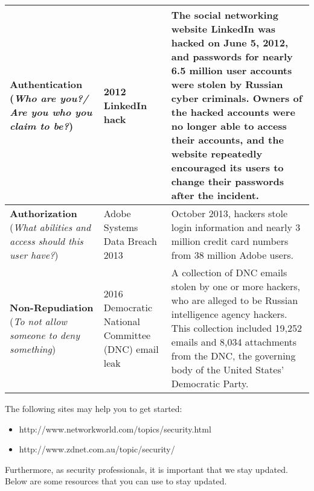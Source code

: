 \documentclass[11pt,letterpaper]{article}
\begin{document}
\begin{table}[htbp]
\begin{tabularx}{\columnwidth}{|p{3.4cm}|p{3.4cm}|X|}
        \hline
        \textbf{Authentication} (\textit{Who are you?/ Are you who you claim to be?}) & 2012 LinkedIn hack
        & The social networking website LinkedIn was hacked on June 5, 2012, and passwords for nearly 6.5 million user accounts were stolen by Russian cyber criminals. Owners of the hacked accounts were no longer able to access their accounts, and the website repeatedly encouraged its users to change their passwords after the incident\cite{LinkedIn}.
        \\ \hline
        
        \hline
        \textbf{Authorization} (\textit{What abilities and access should this user have?}) & Adobe Systems Data Breach 2013
        & October 2013, hackers stole login information and nearly 3 million credit card numbers from 38 million Adobe users\cite{Adobe}.
        \\ \hline
        
        \hline
        \textbf{Non-Repudiation} (\textit{To not allow someone to deny something}) &
        2016 Democratic National Committee (DNC) email leak
        & A collection of DNC emails stolen by one or more hackers, who are alleged to be Russian intelligence agency hackers. This collection included 19,252 emails and 8,034 attachments from the DNC, the governing body of the United States' Democratic Party\cite{dnc_mails}.
        \\ \hline
        
        
    \end{tabularx}
\end{table}

The following sites may help you to get started:
\begin{itemize}
    \item http://www.networkworld.com/topics/security.html
    \item http://www.zdnet.com.au/topic/security/ 
\end{itemize}

Furthermore, as security professionals, it is important that we stay updated. Below are some resources that you can use to stay updated. 
\end{document}
